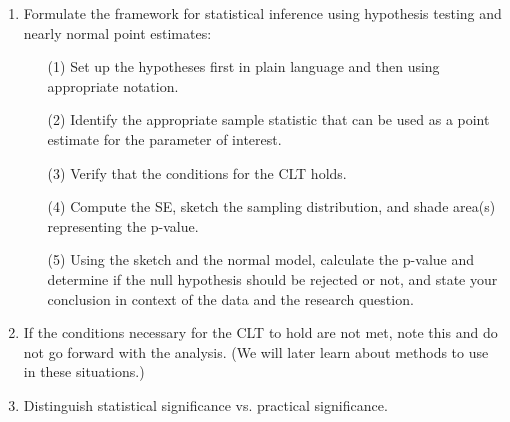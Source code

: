 \documentclass[11pt]{article}
\begin{document}
\begin{enumerate}[resume]
\item Formulate the framework for statistical inference using hypothesis testing and nearly normal point estimates:
\begin{enumerate}
\item[(1)] Set up the hypotheses first in plain language and then using appropriate notation.
\item[(2)] Identify the appropriate sample statistic that can be used as a point estimate for the parameter of interest.
\item[(3)] Verify that the conditions for the CLT holds.
\item[(4)] Compute the SE, sketch the sampling distribution, and shade area(s) representing the p-value.
\item[(5)] Using the sketch and the normal model, calculate the p-value and determine if the null hypothesis should be rejected or not, and state your conclusion in context of the data and the research question.
\end{enumerate}

\item If the conditions necessary for the CLT to hold are not met, note this and do not go forward with the analysis. (We will later learn about methods to use in these situations.)

\item Distinguish statistical significance vs. practical significance.


\end{enumerate}
\end{document}
